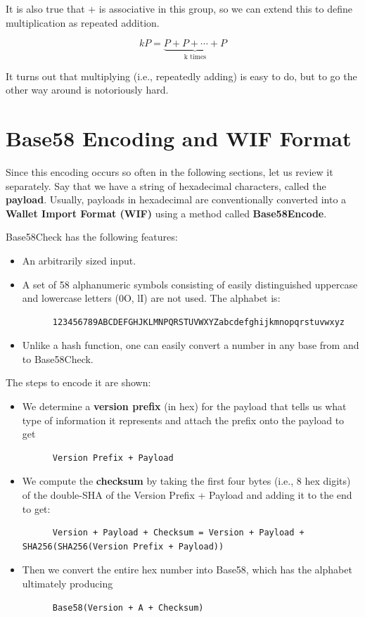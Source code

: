 \documentclass{article}
\begin{document}
    It is also true that $+$ is associative in this group, so we can extend this to define multiplication as repeated addition.

    \begin{equation}
    kP = \underbrace{P + P + \cdots + P}_{\text{k times}}
    \end{equation}

    It turns out that multiplying (i.e., repeatedly adding) is easy to do, but to go the other way around is notoriously hard.

\section{Base58 Encoding and WIF Format}

  Since this encoding occurs so often in the following sections, let us review it separately. Say that we have a string of hexadecimal characters, called the \textbf{payload}. Usually, payloads in hexadecimal are conventionally converted into a \textbf{Wallet Import Format (WIF)} using a method called \textbf{Base58Encode}.

  Base58Check has the following features:
  \begin{itemize}
    \item An arbitrarily sized input.
    \item A set of 58 alphanumeric symbols consisting of easily distinguished uppercase and lowercase letters (0O, lI) are not used. The alphabet is:
    \begin{lstlisting}
      123456789ABCDEFGHJKLMNPQRSTUVWXYZabcdefghijkmnopqrstuvwxyz
    \end{lstlisting}
    \item Unlike a hash function, one can easily convert a number in any base from and to Base58Check.
  \end{itemize}

  The steps to encode it are shown:
  \begin{itemize}
    \item We determine a \textbf{version prefix} (in hex) for the payload that tells us what type of information it represents and attach the prefix onto the payload to get
    \begin{lstlisting}
      Version Prefix + Payload
    \end{lstlisting}
    \item We compute the \textbf{checksum} by taking the first four bytes (i.e., 8 hex digits) of the double-SHA of the Version Prefix + Payload and adding it to the end to get:
    \begin{lstlisting}
      Version + Payload + Checksum = Version + Payload + SHA256(SHA256(Version Prefix + Payload))
    \end{lstlisting}
    \item Then we convert the entire hex number into Base58, which has the alphabet ultimately producing
    \begin{lstlisting}
      Base58(Version + A + Checksum)
    \end{lstlisting}
  \end{itemize}
\end{document}
